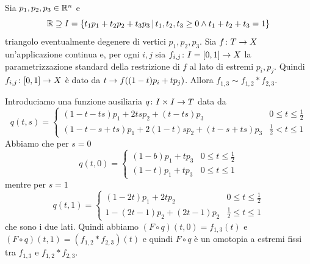 \documentclass[a4paper]{article}
\begin{document}
\begin{center}
\end{center}

\begin{snippetlemma}{}
    Sia \(p_1, p_2, p_3 \in \mathbb{R}^n\)
    e \[\mathbb{R} \supseteq I = \{t_1p_1 + t_2p_2 + t_3p_3 \,|\, t_1,t_2,t_3 \geq 0 \land t_1 + t_2 + t_3 = 1\}\]
    triangolo eventualmente degenere di vertici \(p_1, p_2, p_3\).
    Sia \(f \colon T \to X\) un'applicazione continua e, per ogni \(i,j\)
    sia \(f_{i,j} \colon I = [0,1] \to X\) la parametrizzazione standard della restrizione di
    \(f\) al lato di estremi \(p_i, p_j\).
    Quindi \(f_{i,j} \colon [0,1] \to X\)
    è dato da \(t \to f((1-t)p_i + tp_j)\).
    Allora \(f_{1,3} \sim f_{1,2} \ast f_{2,3}\).
\end{snippetlemma}

\begin{snippetproof}{}
    Introduciamo una funzione ausiliaria
    \(q \colon I \times I \to T\) data da
    \[
        q(t,s) = \begin{cases}
            (1 -t -ts)p_1 + 2tsp_2 + (t - ts)p_3 & 0 \leq t \leq \frac12 \\
            (1-t-s+ts)p_1 + 2(1-t)sp_2 + (t-s + ts)p_3 & \frac12 < t \leq 1
        \end{cases}
    \]
    Abbiamo che per \(s=0\)
    \[
        q(t, 0) = \begin{cases}
            (1-b)p_1 + tp_3 & 0 \leq t \leq \frac12 \\
            (1-t)p_1 + tp_3 & 0 \leq t \leq 1
        \end{cases}
    \]
    mentre per \(s=1\)
    \[
        q(t,1) = \begin{cases}
            (1-2t)p_1 + 2tp_2 & 0 \leq t \leq \frac12 \\
            1-(2t-1)p_2 + (2t-1)p_2 & \frac12 \leq t \leq 1
        \end{cases}
    \]
    che sono i due lati.
    Quindi abbiamo \((F \circ q)(t,0) = f_{1,3}(t)\)
    e \((F \circ q)(t,1) = (f_{1,2} \ast f_{2,3})(t)\)
    e quindi \(F \circ q\) è un omotopia a estremi fissi tra \(f_{1,3}\)
    e \(f_{1,2} \ast f_{2,3}\).
\end{snippetproof}
\end{document}
